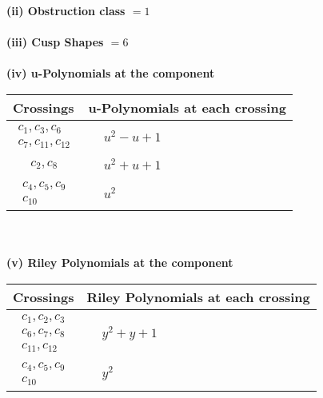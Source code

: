 \documentclass[1p]{elsarticle_modified}
\theoremstyle{definition}
\begin{document}
\flushleft \textbf{(ii) Obstruction class $= 1$}\\~\\
\flushleft \textbf{(iii) Cusp Shapes $= 6$}\\~\\
\newpage\renewcommand{\arraystretch}{1}
\flushleft \textbf{(iv) u-Polynomials at the component}\newline \\
\begin{tabular}{m{50pt}|m{274pt}}
Crossings & \hspace{64pt}u-Polynomials at each crossing \\
\hline $$\begin{aligned}c_{1},c_{3},c_{6}\\c_{7},c_{11},c_{12}\end{aligned}$$&$\begin{aligned}
&u^2- u+1
\end{aligned}$\\
\hline $$\begin{aligned}c_{2},c_{8}\end{aligned}$$&$\begin{aligned}
&u^2+u+1
\end{aligned}$\\
\hline $$\begin{aligned}c_{4},c_{5},c_{9}\\c_{10}\end{aligned}$$&$\begin{aligned}
&u^2
\end{aligned}$\\
\hline
\end{tabular}\\~\\
\newpage\renewcommand{\arraystretch}{1}
\flushleft \textbf{(v) Riley Polynomials at the component}\newline \\
\begin{tabular}{m{50pt}|m{274pt}}
Crossings & \hspace{64pt}Riley Polynomials at each crossing \\
\hline $$\begin{aligned}c_{1},c_{2},c_{3}\\c_{6},c_{7},c_{8}\\c_{11},c_{12}\end{aligned}$$&$\begin{aligned}
&y^2+y+1
\end{aligned}$\\
\hline $$\begin{aligned}c_{4},c_{5},c_{9}\\c_{10}\end{aligned}$$&$\begin{aligned}
&y^2
\end{aligned}$\\
\hline
\end{tabular}\\~\\
\end{document}
